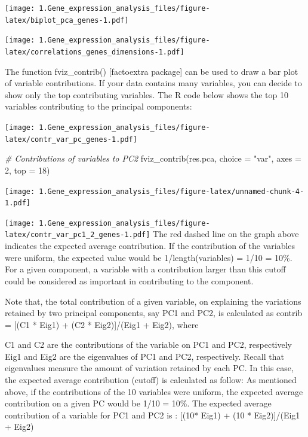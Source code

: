 \documentclass[
]{article}
\newenvironment{Shaded}{\begin{snugshade}}{\end{snugshade}}
\newcommand{\AttributeTok}[1]{\textcolor[rgb]{0.77,0.63,0.00}{#1}}
\newcommand{\CommentTok}[1]{\textcolor[rgb]{0.56,0.35,0.01}{\textit{#1}}}
\newcommand{\DecValTok}[1]{\textcolor[rgb]{0.00,0.00,0.81}{#1}}
\newcommand{\FunctionTok}[1]{\textcolor[rgb]{0.00,0.00,0.00}{#1}}
\newcommand{\NormalTok}[1]{#1}
\newcommand{\StringTok}[1]{\textcolor[rgb]{0.31,0.60,0.02}{#1}}
\begin{document}
\texttt{[image: 1.Gene\_expression\_analysis\_files/figure-latex/biplot\_pca\_genes-1.pdf]}

\texttt{[image: 1.Gene\_expression\_analysis\_files/figure-latex/correlations\_genes\_dimensions-1.pdf]}

The function fviz\_contrib() {[}factoextra package{]} can be used to
draw a bar plot of variable contributions. If your data contains many
variables, you can decide to show only the top contributing variables.
The R code below shows the top 10 variables contributing to the
principal components:

\texttt{[image: 1.Gene\_expression\_analysis\_files/figure-latex/contr\_var\_pc\_genes-1.pdf]}

\begin{Shaded}
\begin{Highlighting}[]
\CommentTok{\# Contributions of variables to PC2}
\FunctionTok{fviz\_contrib}\NormalTok{(res.pca, }\AttributeTok{choice =} \StringTok{"var"}\NormalTok{, }\AttributeTok{axes =} \DecValTok{2}\NormalTok{, }\AttributeTok{top =} \DecValTok{18}\NormalTok{)}
\end{Highlighting}
\end{Shaded}

\texttt{[image: 1.Gene\_expression\_analysis\_files/figure-latex/unnamed-chunk-4-1.pdf]}

\texttt{[image: 1.Gene\_expression\_analysis\_files/figure-latex/contr\_var\_pc1\_2\_genes-1.pdf]}
The red dashed line on the graph above indicates the expected average
contribution. If the contribution of the variables were uniform, the
expected value would be 1/length(variables) = 1/10 = 10\%. For a given
component, a variable with a contribution larger than this cutoff could
be considered as important in contributing to the component.

Note that, the total contribution of a given variable, on explaining the
variations retained by two principal components, say PC1 and PC2, is
calculated as contrib = {[}(C1 * Eig1) + (C2 * Eig2){]}/(Eig1 + Eig2),
where

C1 and C2 are the contributions of the variable on PC1 and PC2,
respectively Eig1 and Eig2 are the eigenvalues of PC1 and PC2,
respectively. Recall that eigenvalues measure the amount of variation
retained by each PC. In this case, the expected average contribution
(cutoff) is calculated as follow: As mentioned above, if the
contributions of the 10 variables were uniform, the expected average
contribution on a given PC would be 1/10 = 10\%. The expected average
contribution of a variable for PC1 and PC2 is : {[}(10* Eig1) + (10 *
Eig2){]}/(Eig1 + Eig2)
\end{document}
